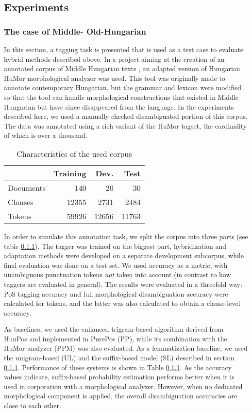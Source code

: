 \subsection{Experiments}

\subsubsection{The case of Middle- Old-Hungarian}

In this section, a tagging task is presented that is used as a test case to evaluate hybrid methods described above.
In a project aiming at the creation of an annotated corpus of Middle Hungarian texts , an adapted version of Hungarian HuMor morphological analyzer was used.
This tool was originally made to annotate contemporary Hungarian, but the grammar and lexicon were modified so that the tool can handle morphological constructions that existed in Middle Hungarian but have since disappeared from the language.
In the experiments described here, we used a manually checked disambiguated portion of this corpus.
The data was annotated using a rich variant of the HuMor tagset, the cardinality of which is over a thousand.

\begin{table}[ht]
\centering
\caption{Characteristics of the used corpus}\label{tab:corpus}
\begin{tabular}{l r r r}
\hline
& Training & Dev. & Test \\
\hline
Documents & 140 & 20 & 30 \\
Clauses & 12355 & 2731 & 2484 \\
Tokens & 59926 & 12656 &  11763\\
\hline
\end{tabular}
\end{table}


In order to simulate this annotation task, we split the corpus into three parts (see table \ref{}).
The tagger was trained on the biggest part, hybridization and adaptation methods were developed on a separate development subcorpus, while final evaluation was done on a test set.
We used accuracy as a metric, with unambiguous punctuation tokens \emph{not} taken into account (in contrast to how taggers are evaluated in general).
The results were evaluated in a threefold way: PoS tagging accuracy and full morphological disambiguation accuracy were calculated for tokens, and the latter was also calculated to obtain a clause-level accuracy.

As baselines, we used the enhanced trigram-based algorithm derived from HunPos and implemented in PurePos (PP), while its combination with the HuMor analyzer (PPM) was also evaluated.
As a lemmatization baseline, we used the unigram-based (UL) and the suffix-based model (SL) described in section \ref{}.
Performance of these systems is shown in Table \ref{}.
As the accuracy values indicate, suffix-based probability estimation performs better when it is used in corporation with a morphological analyzer.
However, when no dedicated morphological component is applied, the overall disambiguation accuracies are close to each other.

